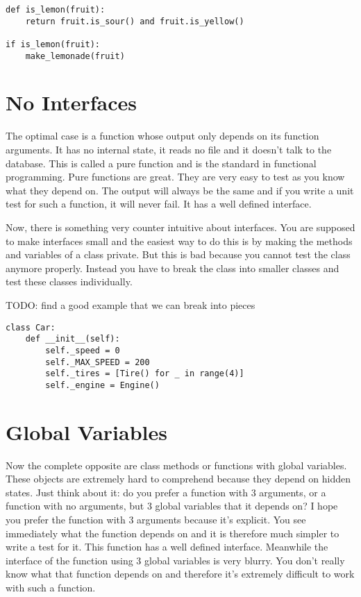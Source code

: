\begin{programcode}{}
\begin{verbatim}
def is_lemon(fruit):
    return fruit.is_sour() and fruit.is_yellow()

if is_lemon(fruit):
    make_lemonade(fruit)
\end{verbatim}
\end{programcode}

\section{No Interfaces}

The optimal case is a function whose output only depends on its function arguments. It has no internal state, it reads no file and it doesn't talk to the database. This is called a pure function and is the standard in functional programming. Pure functions are great. They are very easy to test as you know what they depend on. The output will always be the same and if you write a unit test for such a function, it will never fail. It has a well defined interface.

Now, there is something very counter intuitive about interfaces. You are supposed to make interfaces small and the easiest way to do this is by making the methods and variables of a class private. But this is bad because you cannot test the class anymore properly. Instead you have to break the class into smaller classes and test these classes individually.

TODO: find a good example that we can break into pieces
\begin{programcode}{}
\begin{verbatim}
class Car:
    def __init__(self):
        self._speed = 0
        self._MAX_SPEED = 200
        self._tires = [Tire() for _ in range(4)]
        self._engine = Engine()

\end{verbatim}    
\end{programcode}

\section{Global Variables}

Now the complete opposite are class methods or functions with global variables. These objects are extremely hard to comprehend because they depend on hidden states. Just think about it: do you prefer a function with 3 arguments, or a function with no arguments, but 3 global variables that it depends on? I hope you prefer the function with 3 arguments because it's explicit. You see immediately what the function depends on and it is therefore much simpler to write a test for it. This function has a well defined interface. Meanwhile the interface of the function using 3 global variables is very blurry. You don't really know what that function depends on and therefore it's extremely difficult to work with such a function.

